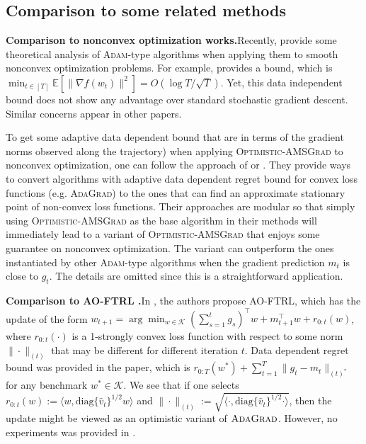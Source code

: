 \documentclass[11pt]{article}
\def\K{\mathcal{K}}
\theoremstyle{k}
\begin{document}
\subsection{Comparison to some related methods} \label{app:related}

\textbf{Comparison to nonconvex optimization works.}\hspace{0.1in}Recently, \cite{ZRSKK18,CLSH19,WWB18,ZTYCG18,ZS18,LO18} provide some theoretical analysis 
of \textsc{Adam}-type algorithms when applying them to smooth nonconvex optimization problems.
For example, \cite{CLSH19} provides a bound,
which is $\min_{t \in [T]} \mathbb{E}[\| \nabla f(w_t) \|^2 ] = O(\log T / \sqrt{T}) $.
Yet, this data independent bound does not show any advantage over standard stochastic gradient descent. Similar concerns appear in other papers.

To get some adaptive data dependent bound that are in terms of the gradient norms observed along the trajectory) when applying 
\textsc{Optimistic-AMSGrad} to nonconvex optimization,
one can follow the approach of \cite{Princeton18} or \cite{CYYZC19}.
They provide ways to convert algorithms with adaptive data dependent regret bound
for convex loss functions (e.g. \textsc{AdaGrad}) to the ones that can find an approximate stationary point of non-convex loss functions. 
Their approaches are modular so that simply using \textsc{Optimistic-AMSGrad}
as the base algorithm in their methods will immediately lead to a variant of \textsc{Optimistic-AMSGrad} that enjoys some guarantee on nonconvex optimization.
The variant can outperform the ones instantiated by other \textsc{Adam}-type algorithms when
the gradient prediction $m_t$ is close to $g_t$.
The details are omitted since this is a straightforward application.

\textbf{Comparison to AO-FTRL \cite{MY16}.}\hspace{0.1in}In \cite{MY16}, the authors propose AO-FTRL, which has the update of 
the form $w_{t+1} = \arg\min_{{w \in \K}} ( \sum_{s=1}^t g_s )^{\top}  w + m_{t+1}^\top w + r_{0:t}(w) $, where $r_{0:t}(\cdot)$ is a 1-strongly convex loss function with respect to some norm $\| \cdot\|_{(t)}$ that may be different for different iteration $t$. 
Data dependent regret bound was provided in the paper, which is $r_{{0:T}}(w^*) + \sum_{t=1}^T \| g_t - m_t \|_{(t)^*}$ for any benchmark $w^{*} \in \K$. We see that if
one selects $r_{0:t}(w) := \langle w, \text{diag}\{\hat{v}_t\}^{1/2} w \rangle$ 
and $\| \cdot \|_{(t)}:= 
\sqrt{ \langle \cdot, \text{diag}\{\hat{v}_t\}^{1/2} \cdot \rangle }$, then the update might be viewed as an optimistic variant of $\textsc{AdaGrad}$. However, no experiments was provided in \cite{MY16}. 
\end{document}
